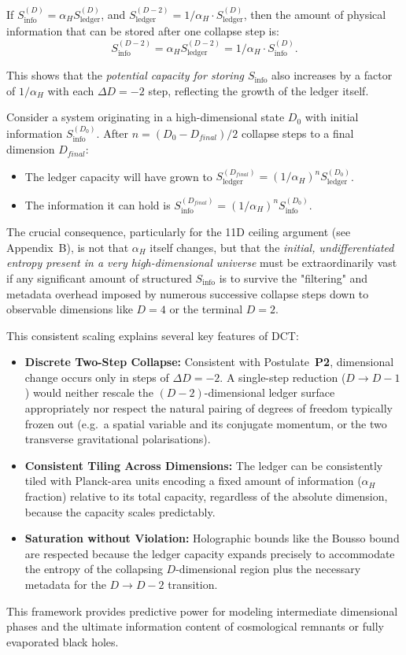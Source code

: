 \documentclass[a4paper, 12pt, oneside]{book}
\numberwithin{equation}{chapter}
\begin{document}
If $S_{\text{info}}^{(D)} = \alpha_H S_{\text{ledger}}^{(D)}$, and $S_{\text{ledger}}^{(D-2)} = 1/\alpha_H \cdot S_{\text{ledger}}^{(D)}$, then the amount of physical information that can be stored after one collapse step is:
\[
S_{\text{info}}^{(D-2)} = \alpha_H S_{\text{ledger}}^{(D-2)} = 1/\alpha_H \cdot S_{\text{info}}^{(D)}.
\]

This shows that the \emph{potential capacity for storing \(S_{\text{info}}\)} also increases by a factor of $1/\alpha_H$ with each $\Delta D = -2$ step, reflecting the growth of the ledger itself.

Consider a system originating in a high-dimensional state $D_0$ with initial information $S_{\text{info}}^{(D_0)}$. After $n = (D_0 - D_{final})/2$ collapse steps to a final dimension $D_{final}$:
\begin{itemize}
    \item The ledger capacity will have grown to $S_{\text{ledger}}^{(D_{final})} = (1/\alpha_H)^n S_{\text{ledger}}^{(D_0)}$.
    \item The information it can hold is $S_{\text{info}}^{(D_{final})} = (1/\alpha_H)^n S_{\text{info}}^{(D_0)}$.
\end{itemize}
The crucial consequence, particularly for the 11D ceiling argument (see Appendix~B), is not that $\alpha_H$ itself changes, but that the \emph{initial, undifferentiated entropy present in a very high-dimensional universe} must be extraordinarily vast if any significant amount of structured $S_{\text{info}}$ is to survive the "filtering" and metadata overhead imposed by numerous successive collapse steps down to observable dimensions like $D=4$ or the terminal $D=2$.

This consistent scaling explains several key features of DCT:
\begin{itemize}
  \item \textbf{Discrete Two-Step Collapse:} Consistent with Postulate~\textbf{P2}, dimensional change occurs only in steps of \(\Delta D = -2\). A single-step reduction (\(D \to D-1\)) would neither rescale the \((D-2)\)-dimensional ledger surface appropriately nor respect the natural pairing of degrees of freedom typically frozen out (e.g.\ a spatial variable and its conjugate momentum, or the two transverse gravitational polarisations).

  \item \textbf{Consistent Tiling Across Dimensions:} The ledger can be consistently tiled with Planck-area units encoding a fixed amount of information ($\alpha_H$ fraction) relative to its total capacity, regardless of the absolute dimension, because the capacity scales predictably.
  \item \textbf{Saturation without Violation:} Holographic bounds like the Bousso bound are respected because the ledger capacity expands precisely to accommodate the entropy of the collapsing $D$-dimensional region plus the necessary metadata for the $D \to D-2$ transition.
\end{itemize}
This framework provides predictive power for modeling intermediate dimensional phases and the ultimate information content of cosmological remnants or fully evaporated black holes.
\end{document}
